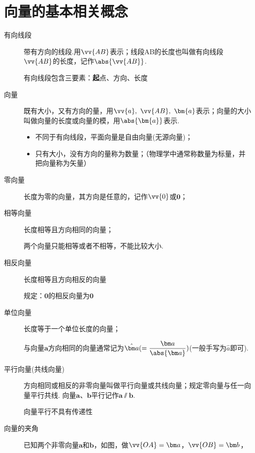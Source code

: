   \newtheorem*{Theorem}{定理}
  \makefront
\vspace{-1.5em}
\startexercise
\section{向量的基本相关概念}
  \begin{description}
    \item[有向线段]带有方向的线段.用$\vv{AB}$表示；线段AB的长度也叫做有向线段$\vv{AB}$的长度，记作$\abs{\vv{AB}}$.\par
      {\kaishu 有向线段包含三要素：{\textbf 起点、方向、长度}}
    \item[向量] 既有大小，又有方向的量，用$ \vv{a},~\vv{AB},~\bm{a} $表示；向量的大小叫做向量的长度或向量的模，用$ \abs{\bm{a}} $表示.\par
      \begin{itemize}[leftmargin=*]
        \kaishu
        \item 不同于有向线段，平面向量是自由向量(无源向量)；
        \item 只有大小，没有方向的量称为数量；（物理学中通常称数量为标量，并把向量称为矢量）
      \end{itemize}
    \item[零向量] 长度为零的向量，其方向是任意的，记作$ \vv{0} $或$ \bm{0} $；
    \item[相等向量] 长度相等且方向相同的向量；\par
      {\kaishu 两个向量只能相等或者不相等，不能比较大小.}
    \item[相反向量] 长度相等且方向相反的向量\par
      {\kaishu 规定：$\bm{0}$的相反向量为$\bm{0}$}
    \item[单位向量] 长度等于一个单位长度的向量；\par
      {\kaishu 与向量$\bm a$方向相同的向量通常记为$\hat{\bm a}(=\dfrac{\bm a}{\abs{\bm a}})$}(一般手写为$\hat a$即可).
    \item[平行向量(共线向量)]方向相同或相反的非零向量叫做平行向量或共线向量；规定零向量与任一向量平行共线.
      向量$\bm{a}$、$\bm{b}$平行记作$\bm{a}\varparallel \bm{b}$.\par
      {\kaishu 向量平行不具有传递性}
    \item[向量的夹角] 已知两个非零向量$\bm a$和$\bm b$，如图，做$\vv{OA}=\bm a$，$\vv{OB}=\bm b$，

\end{description}
